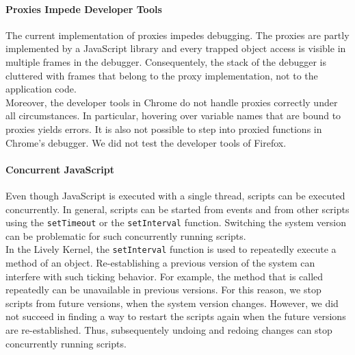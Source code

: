 \paragraph{Proxies Impede Developer Tools}
The current implementation of proxies impedes debugging.
The proxies are partly implemented by a JavaScript library and every trapped object access is visible in multiple frames in the debugger.
Consequentely, the stack of the debugger is cluttered with frames that belong to the proxy implementation, not to the application code.\\
Moreover, the developer tools in Chrome do not handle proxies correctly under all circumstances.
In particular, hovering over variable names that are bound to proxies yields errors.
It is also not possible to step into proxied functions in Chrome's debugger.
We did not test the developer tools of Firefox.

\paragraph{Concurrent JavaScript}
Even though JavaScript is executed with a single thread, scripts can be executed concurrently.
In general, scripts can be started from events and from other scripts using the \lstinline{setTimeout} or the \lstinline{setInterval} function.
Switching the system version can be problematic for such concurrently running scripts.\\
In the Lively Kernel, the \lstinline{setInterval} function is used to repeatedly execute a method of an object.
Re-establishing a previous version of the system can interfere with such ticking behavior.
For example, the method that is called repeatedly can be unavailable in previous versions.
For this reason, we stop scripts from future versions, when the system version changes.
However, we did not succeed in finding a way to restart the scripts again when the future versions are re-established.
Thus, subsequentely undoing and redoing changes can stop concurrently running scripts.

